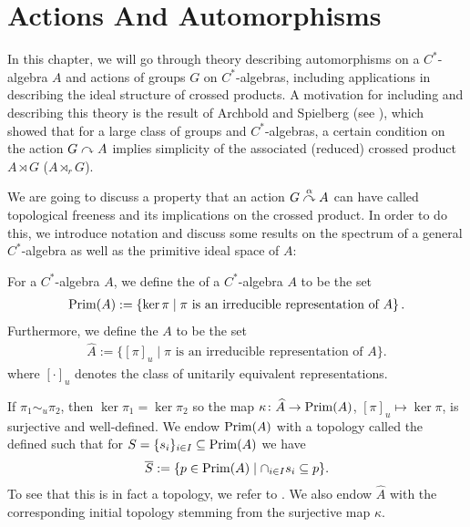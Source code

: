 \chapter{Actions And Automorphisms}
In this chapter, we will go through theory describing automorphisms on a $C^*$-algebra $A$ and actions of groups $G$ on $C^*$-algebras, including applications in describing the ideal structure of crossed products. A motivation for including and describing this theory is the result of Archbold and Spielberg (see \cite{archbold1994topologically}), which showed that for a large class of groups and $C^*$-algebras, a certain condition on the action $G \stackrel{}{\curvearrowright} A$ implies simplicity of the associated (reduced) crossed product $A \rtimes G$ ($A \rtimes_{r} G$).

We are going to discuss a property that an action $G \stackrel{\alpha}{\curvearrowright} A$ can have called topological freeness and its implications on the crossed product. In order to do this, we introduce notation and discuss some results on the spectrum of a general $C^*$-algebra as well as the primitive ideal space of $A$:
\begin{definition}
	For a $C^*$-algebra $A$, we define the  of a $C^*$-algebra $A$ to be the set
	\begin{align*}
		\mathrm{Prim}(A) := \left\{ \ker \pi \mid \pi \text{ is an irreducible representation of } A \right\}.
	\end{align*}
	Furthermore, we define the  $A$ to be the set
	\begin{align*}
		\hat A := \{[\pi]_u \mid \pi \text{ is an irreducible representation of } A \}.
	\end{align*}
where $[\cdot]_u$ denotes the class of unitarily equivalent representations.

If $\pi_1 \sim_u \pi_2$, then $\ker \pi_1 = \ker \pi_2$ so the map $\kappa \colon \widehat{A} \to \mathrm{Prim}(A)$, $[\pi]_u \mapsto \ker \pi$, is surjective and well-defined. We endow $\mathrm{Prim}(A)$ with a topology called the  defined such that for $S = \{s_i\}_{i \in I} \subseteq \mathrm{Prim}(A)$ we have
\begin{align*}
	\overline S := \{ p \in \mathrm{Prim}(A) \mid \cap_{i \in I} s_i \subseteq p\}.
\end{align*}
To see that this is in fact a topology, we refer to \cite[Appendix A.2]{williamsmorita}. We also endow $\hat A$ with the corresponding initial topology stemming from the surjective map $\kappa$.
\end{definition}
